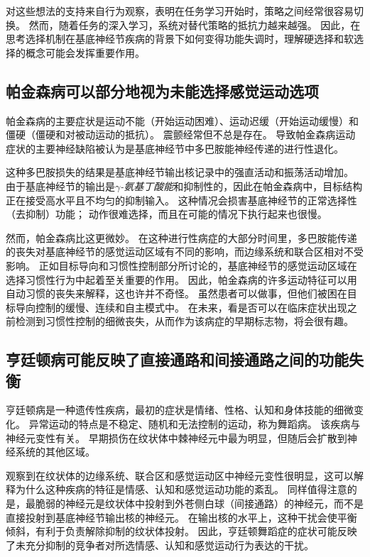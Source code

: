 对这些想法的支持来自行为观察，表明在任务学习开始时，策略之间经常很容易切换。
然而，随着任务的深入学习，系统对替代策略的抵抗力越来越强。
因此，在思考选择机制在基底神经节疾病的背景下如何变得功能失调时，理解硬选择和软选择的概念可能会发挥重要作用。



\subsection{帕金森病可以部分地视为未能选择感觉运动选项}

帕金森病的主要症状是运动不能（开始运动困难）、运动迟缓（开始运动缓慢）和僵硬（僵硬和对被动运动的抵抗）。
震颤经常但不总是存在。
导致帕金森病运动症状的主要神经缺陷被认为是基底神经节中多巴胺能神经传递的进行性退化。


这种多巴胺损失的结果是基底神经节输出核记录中的强直活动和振荡活动增加。
由于基底神经节的输出是\textit{$\gamma$-氨基丁酸能}和抑制性的，因此在帕金森病中，目标结构正在接受高水平且不均匀的抑制输入。
这种情况会损害基底神经节的正常选择性（去抑制）功能；
动作很难选择，而且在可能的情况下执行起来也很慢。


然而，帕金森病比这更微妙。
在这种进行性病症的大部分时间里，多巴胺能传递的丧失对基底神经节的感觉运动区域有不同的影响，而边缘系统和联合区相对不受影响。
正如目标导向和习惯性控制部分所讨论的，基底神经节的感觉运动区域在选择习惯性行为中起着至关重要的作用。
因此，帕金森病的许多运动特征可以用自动习惯的丧失来解释，这也许并不奇怪。
虽然患者可以做事，但他们被困在目标导向控制的缓慢、连续和自主模式中。
在未来，看是否可以在临床症状出现之前检测到习惯性控制的细微丧失，从而作为该病症的早期标志物，将会很有趣。



\subsection{亨廷顿病可能反映了直接通路和间接通路之间的功能失衡}

亨廷顿病是一种遗传性疾病，最初的症状是情绪、性格、认知和身体技能的细微变化。
异常运动的特点是不稳定、随机和无法控制的运动，称为舞蹈病。
该疾病与神经元变性有关。
早期损伤在纹状体中棘神经元中最为明显，但随后会扩散到神经系统的其他区域。


观察到在纹状体的边缘系统、联合区和感觉运动区中神经元变性很明显，这可以解释为什么这种疾病的特征是情感、认知和感觉运动功能的紊乱。
同样值得注意的是，最脆弱的神经元是纹状体中投射到外苍侧白球（间接通路）的神经元，而不是直接投射到基底神经节输出核的神经元。
在输出核的水平上，这种干扰会使平衡倾斜，有利于负责解除抑制的纹状体投射。
因此，亨廷顿舞蹈症的症状可能反映了未充分抑制的竞争者对所选情感、认知和感觉运动行为表达的干扰。



